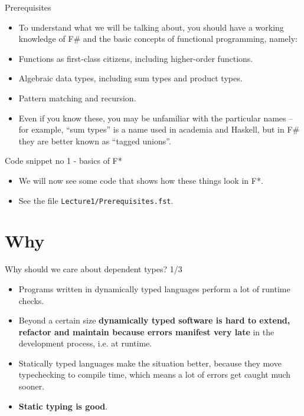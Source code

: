 \documentclass{beamer}
\begin{document}
\begin{frame}{Prerequisites}
\begin{itemize}
	\item To understand what we will be talking about, you should have a working knowledge of F\# and the basic concepts of functional programming, namely:
	\item Functions as first-class citizens, including higher-order functions.
	\item Algebraic data types, including sum types and product types.
	\item Pattern matching and recursion.
	\item Even if you know these, you may be unfamiliar with the particular names -- for example, ``sum types'' is a name used in academia and Haskell, but in F\# they are better known as ``tagged unions''.
\end{itemize}
\end{frame}

\begin{frame}{Code snippet no 1 - basics of F*}
\begin{itemize}
	\item We will now see some code that shows how these things look in F*.
	\item See the file \texttt{Lecture1/Prerequisites.fst}.
\end{itemize}
\end{frame}

\section{Why}

\begin{frame}{Why should we care about dependent types? 1/3}
\begin{itemize}
	\item Programs written in dynamically typed languages perform a lot of runtime checks.
	\item Beyond a certain size \textbf{dynamically typed software is hard to extend, refactor and maintain because errors manifest very late} in the development process, i.e. at runtime.
	\item Statically typed languages make the situation better, because they move typechecking to compile time, which means a lot of errors get caught much sooner.
	\item \textbf{Static typing is good}.
\end{itemize}
\end{frame}
\end{document}
